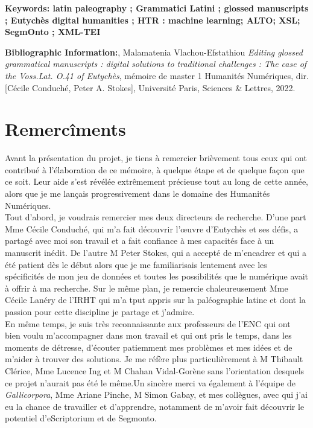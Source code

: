 \documentclass[a4paper, twoside, 12pt]{book}
\begin{document}
\medskip

\textbf{Keywords: latin paleography ; Grammatici Latini  ; glossed manuscripts ; Eutychès digital humanities ; HTR  : machine learning; ALTO; XSL; SegmOnto ; XML-TEI }

\textbf{Bibliographic Information:}, Malamatenia Vlachou-Efstathiou \textit{Editing glossed grammatical manuscripts : digital solutions to traditional challenges : The case of the \textit{Voss.Lat. O.41} of Eutychès}, mémoire de master 1 \og Humanités Numériques\fg{}, dir. [Cécile Conduché, Peter A. Stokes], Université Paris, Sciences \& Lettres, 2022.

\clearpage

\section*{Remercîments}

Avant la présentation du projet, je tiens à remercier brièvement tous ceux qui ont contribué à l'élaboration de ce mémoire, à quelque étape et de quelque façon que ce soit. Leur aide s'est révélée extrêmement précieuse tout au long de cette année, alors que je me lançais progressivement dans le domaine des Humanités Numériques.\\

Tout d'abord, je voudrais remercier mes deux directeurs de recherche. D’une part Mme Cécile Conduché, qui m'a fait découvrir l'œuvre d'Eutychès et ses défis, a partagé avec moi son travail et a fait confiance à mes capacités face à un manuscrit inédit. De l’autre M  Peter Stokes, qui a accepté de m'encadrer et qui a été patient dès le début alors que je me familiarisais lentement avec les spécificités de mon jeu de données et toutes les possibilités que le numérique avait à offrir à ma recherche. Sur le même plan, je remercie chaleureusement Mme Cécile Lanéry de l'IRHT qui m'a tput appris sur la paléographie latine et dont la passion pour cette discipline je partage et j’admire. \\

 En même temps, je suis très reconnaissante aux professeurs de l'ENC qui ont bien voulu m'accompagner dans mon travail et qui ont pris le temps, dans les moments de détresse, d'écouter patiemment mes problèmes et mes idées et de m'aider à trouver des solutions. Je me réfère plus particulièrement à M  Thibault Clérice, Mme Lucence Ing et M Chahan Vidal-Gorène sans l'orientation desquels ce projet n'aurait pas été le même.Un sincère merci va également à l'équipe de \textit{Gallicorpora}, Mme Ariane Pinche, M  Simon Gabay, et mes collègues, avec qui j'ai eu la chance de travailler et d'apprendre, notamment de m'avoir fait découvrir le potentiel d'eScriptorium et de Segmonto. \\
\end{document}
